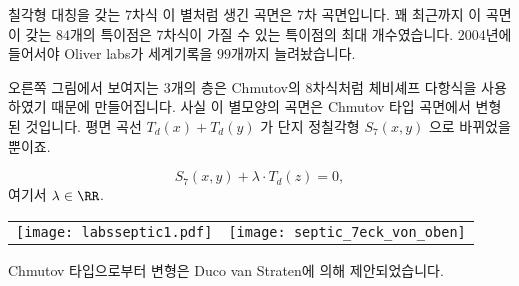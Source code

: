 \begin{surferPage}[칠각형 대칭]{칠각형 대칭을 갖는 $7$차식}
    이 별처럼 생긴 곡면은 $7$차 곡면입니다. 꽤 최근까지 이 곡면이 갖는 $84$개의 특이점은 $7$차식이 가질 수 있는 특이점의 최대 개수였습니다. $2004$년에 들어서야 Oliver labs가 세계기록을 $99$개까지 늘려놨습니다.
  
  
오른쪽 그림에서 보여지는 $3$개의 층은 Chmutov의 $8$차식처럼 체비셰프 다항식을 사용하였기 때문에 만들어집니다. 사실 이 별모양의 곡면은 Chmutov 타입 곡면에서 변형된 것입니다. 평면 곡선 $T_d(x)+T_d(y)$ 가 단지 정칠각형 $S_7(x,y)$ 으로 바뀌었을 뿐이죠. 
   
   \[S_7(x,y) + \lambda \cdot T_d(z) = 0,\]
    여기서 $\lambda\in\RR$. 
    \vspace*{-0.3em}
    \begin{center}
      \begin{tabular}{c@{\qquad}c}
        \texttt{[image: labsseptic1.pdf]}
        &
        \texttt{[image: septic\_7eck\_von\_oben]}
      \end{tabular}
    \end{center}
    \vspace*{-0.3em}   
Chmutov 타입으로부터 변형은 Duco van Straten에 의해 제안되었습니다.
\end{surferPage}
